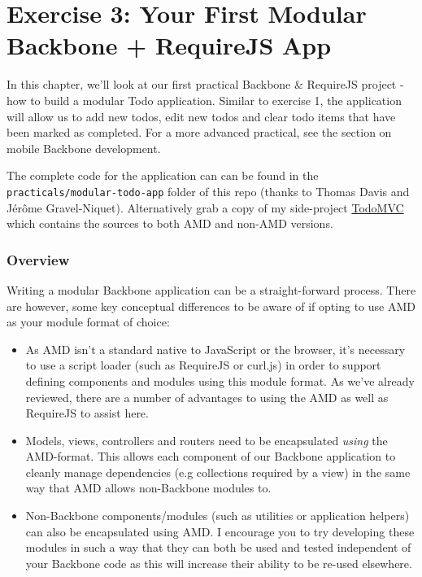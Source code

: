 \documentclass[9pt]{book}
\begin{document}
\section{Exercise 3: Your First Modular Backbone + RequireJS
App}\label{exercise-3-your-first-modular-backbone-requirejs-app}

In this chapter, we'll look at our first practical Backbone \& RequireJS
project - how to build a modular Todo application. Similar to exercise
1, the application will allow us to add new todos, edit new todos and
clear todo items that have been marked as completed. For a more advanced
practical, see the section on mobile Backbone development.

The complete code for the application can can be found in the
\texttt{practicals/modular-todo-app} folder of this repo (thanks to
Thomas Davis and Jérôme Gravel-Niquet). Alternatively grab a copy of my
side-project \href{https://github.com/addyosmani/todomvc}{TodoMVC} which
contains the sources to both AMD and non-AMD versions.

\subsubsection{Overview}\label{overview}

Writing a modular Backbone application can be a straight-forward
process. There are however, some key conceptual differences to be aware
of if opting to use AMD as your module format of choice:

\begin{itemize}
\itemsep1pt\parskip0pt
\item
  As AMD isn't a standard native to JavaScript or the browser, it's
  necessary to use a script loader (such as RequireJS or curl.js) in
  order to support defining components and modules using this module
  format. As we've already reviewed, there are a number of advantages to
  using the AMD as well as RequireJS to assist here.
\item
  Models, views, controllers and routers need to be encapsulated
  \emph{using} the AMD-format. This allows each component of our
  Backbone application to cleanly manage dependencies (e.g collections
  required by a view) in the same way that AMD allows non-Backbone
  modules to.
\item
  Non-Backbone components/modules (such as utilities or application
  helpers) can also be encapsulated using AMD. I encourage you to try
  developing these modules in such a way that they can both be used and
  tested independent of your Backbone code as this will increase their
  ability to be re-used elsewhere.
\end{itemize}
\end{document}
